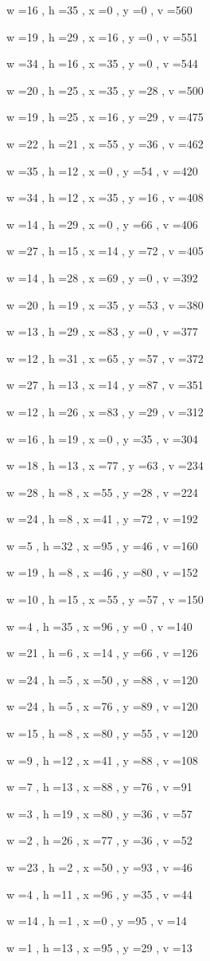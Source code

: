 \documentclass[11pt]{article}
\begin{document}
w =16 , h =35 , x =0 , y =0 , v =560
\par
w =19 , h =29 , x =16 , y =0 , v =551
\par
w =34 , h =16 , x =35 , y =0 , v =544
\par
w =20 , h =25 , x =35 , y =28 , v =500
\par
w =19 , h =25 , x =16 , y =29 , v =475
\par
w =22 , h =21 , x =55 , y =36 , v =462
\par
w =35 , h =12 , x =0 , y =54 , v =420
\par
w =34 , h =12 , x =35 , y =16 , v =408
\par
w =14 , h =29 , x =0 , y =66 , v =406
\par
w =27 , h =15 , x =14 , y =72 , v =405
\par
w =14 , h =28 , x =69 , y =0 , v =392
\par
w =20 , h =19 , x =35 , y =53 , v =380
\par
w =13 , h =29 , x =83 , y =0 , v =377
\par
w =12 , h =31 , x =65 , y =57 , v =372
\par
w =27 , h =13 , x =14 , y =87 , v =351
\par
w =12 , h =26 , x =83 , y =29 , v =312
\par
w =16 , h =19 , x =0 , y =35 , v =304
\par
w =18 , h =13 , x =77 , y =63 , v =234
\par
w =28 , h =8 , x =55 , y =28 , v =224
\par
w =24 , h =8 , x =41 , y =72 , v =192
\par
w =5 , h =32 , x =95 , y =46 , v =160
\par
w =19 , h =8 , x =46 , y =80 , v =152
\par
w =10 , h =15 , x =55 , y =57 , v =150
\par
w =4 , h =35 , x =96 , y =0 , v =140
\par
w =21 , h =6 , x =14 , y =66 , v =126
\par
w =24 , h =5 , x =50 , y =88 , v =120
\par
w =24 , h =5 , x =76 , y =89 , v =120
\par
w =15 , h =8 , x =80 , y =55 , v =120
\par
w =9 , h =12 , x =41 , y =88 , v =108
\par
w =7 , h =13 , x =88 , y =76 , v =91
\par
w =3 , h =19 , x =80 , y =36 , v =57
\par
w =2 , h =26 , x =77 , y =36 , v =52
\par
w =23 , h =2 , x =50 , y =93 , v =46
\par
w =4 , h =11 , x =96 , y =35 , v =44
\par
w =14 , h =1 , x =0 , y =95 , v =14
\par
w =1 , h =13 , x =95 , y =29 , v =13
\par
\newpage
\end{document}
